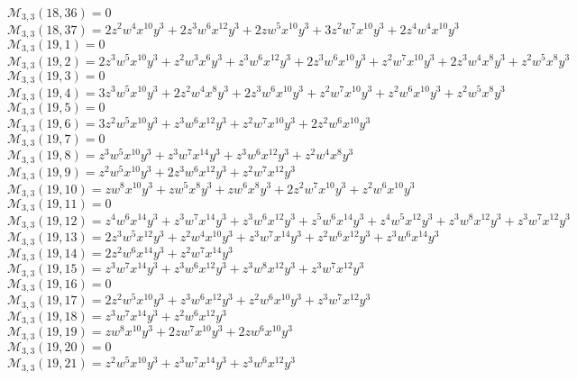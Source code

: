 $\mathcal{M}_{3,3}(18,36)=0$\\
$\mathcal{M}_{3,3}(18,37)=2z^2w^4x^{10}y^3+2z^3w^6x^{12}y^3+2zw^5x^{10}y^3+3z^2w^7x^{10}y^3+2z^4w^4x^{10}y^3$\\
$\mathcal{M}_{3,3}(19,1)=0$\\
$\mathcal{M}_{3,3}(19,2)=2z^3w^5x^{10}y^3+z^2w^3x^6y^3+z^3w^6x^{12}y^3+2z^3w^6x^{10}y^3+z^2w^7x^{10}y^3+2z^3w^4x^8y^3+z^2w^5x^8y^3$\\
$\mathcal{M}_{3,3}(19,3)=0$\\
$\mathcal{M}_{3,3}(19,4)=3z^3w^5x^{10}y^3+2z^2w^4x^8y^3+2z^3w^6x^{10}y^3+z^2w^7x^{10}y^3+z^2w^6x^{10}y^3+z^2w^5x^8y^3$\\
$\mathcal{M}_{3,3}(19,5)=0$\\
$\mathcal{M}_{3,3}(19,6)=3z^2w^5x^{10}y^3+z^3w^6x^{12}y^3+z^2w^7x^{10}y^3+2z^2w^6x^{10}y^3$\\
$\mathcal{M}_{3,3}(19,7)=0$\\
$\mathcal{M}_{3,3}(19,8)=z^3w^5x^{10}y^3+z^3w^7x^{14}y^3+z^3w^6x^{12}y^3+z^2w^4x^8y^3$\\
$\mathcal{M}_{3,3}(19,9)=z^2w^5x^{10}y^3+2z^3w^6x^{12}y^3+z^2w^7x^{12}y^3$\\
$\mathcal{M}_{3,3}(19,10)=zw^8x^{10}y^3+zw^5x^8y^3+zw^6x^8y^3+2z^2w^7x^{10}y^3+z^2w^6x^{10}y^3$\\
$\mathcal{M}_{3,3}(19,11)=0$\\
$\mathcal{M}_{3,3}(19,12)=z^4w^6x^{14}y^3+z^3w^7x^{14}y^3+z^3w^6x^{12}y^3+z^5w^6x^{14}y^3+z^4w^5x^{12}y^3+z^3w^8x^{12}y^3+z^3w^7x^{12}y^3$\\
$\mathcal{M}_{3,3}(19,13)=2z^3w^5x^{12}y^3+z^2w^4x^{10}y^3+z^3w^7x^{14}y^3+z^2w^6x^{12}y^3+z^3w^6x^{14}y^3$\\
$\mathcal{M}_{3,3}(19,14)=2z^2w^6x^{14}y^3+z^2w^7x^{14}y^3$\\
$\mathcal{M}_{3,3}(19,15)=z^3w^7x^{14}y^3+z^3w^6x^{12}y^3+z^3w^8x^{12}y^3+z^3w^7x^{12}y^3$\\
$\mathcal{M}_{3,3}(19,16)=0$\\
$\mathcal{M}_{3,3}(19,17)=2z^2w^5x^{10}y^3+z^3w^6x^{12}y^3+z^2w^6x^{10}y^3+z^3w^7x^{12}y^3$\\
$\mathcal{M}_{3,3}(19,18)=z^3w^7x^{14}y^3+z^2w^6x^{12}y^3$\\
$\mathcal{M}_{3,3}(19,19)=zw^8x^{10}y^3+2zw^7x^{10}y^3+2zw^6x^{10}y^3$\\
$\mathcal{M}_{3,3}(19,20)=0$\\
$\mathcal{M}_{3,3}(19,21)=z^2w^5x^{10}y^3+z^3w^7x^{14}y^3+z^3w^6x^{12}y^3$\\
